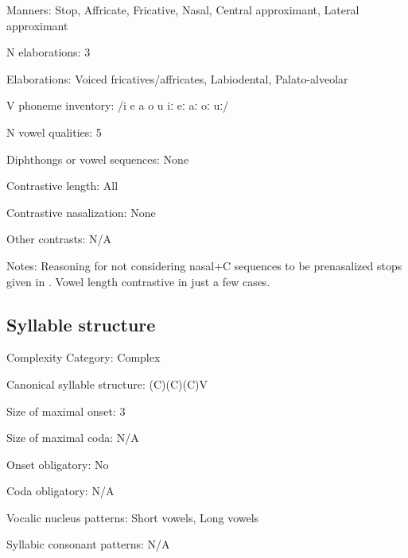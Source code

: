 {\begin{appendixdesc}
\item[Manners:] Stop, Affricate, Fricative, Nasal, Central approximant, Lateral approximant

\item[N elaborations:] 3

\item[Elaborations:] Voiced fricatives/affricates, Labiodental, Palato-alveolar

\item[V phoneme inventory:] /i e a o u iː eː aː oː uː/

\item[N vowel qualities:] 5

\item[Diphthongs or vowel sequences:] None

\item[Contrastive length:] All

\item[Contrastive nasalization:] None

\item[Other contrasts:] N/A

\item[Notes:] Reasoning for not considering nasal+C sequences to be prenasalized stops given in \citet[24]{Kawasha2003}. Vowel length contrastive in just a few cases.
\end{appendixdesc}
\subsection*{Syllable structure}
\begin{appendixdesc}

\item[Complexity Category:] Complex

\item[Canonical syllable structure:] (C)(C)(C)V \citep[20--21]{Kawasha2003}

\item[Size of maximal onset:] 3

\item[Size of maximal coda:] N/A

\item[Onset obligatory:] No

\item[Coda obligatory:] N/A

\item[Vocalic nucleus patterns:] Short vowels, Long vowels

\item[Syllabic consonant patterns:] N/A


\end{appendixdesc}}
